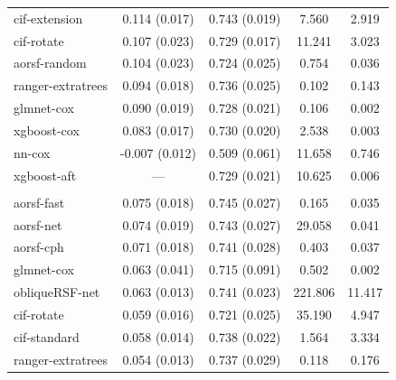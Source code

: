 \documentclass{article}\usepackage[]{graphicx}\usepackage[]{xcolor}
\newenvironment{knitrout}{}{} %
\begin{document}
\begin{knitrout}
\begin{longtable}[t]{lcccc}
\hspace{1em}cif-extension & 0.114 (0.017) & 0.743 (0.019) & 7.560 & 2.919\\
\hspace{1em}cif-rotate & 0.107 (0.023) & 0.729 (0.017) & 11.241 & 3.023\\
\hspace{1em}aorsf-random & 0.104 (0.023) & 0.724 (0.025) & 0.754 & 0.036\\
\hspace{1em}ranger-extratrees & 0.094 (0.018) & 0.736 (0.025) & 0.102 & 0.143\\
\hspace{1em}glmnet-cox & 0.090 (0.019) & 0.728 (0.021) & 0.106 & 0.002\\
\hspace{1em}xgboost-cox & 0.083 (0.017) & 0.730 (0.020) & 2.538 & 0.003\\
\hspace{1em}nn-cox & -0.007 (0.012) & 0.509 (0.061) & 11.658 & 0.746\\
\hspace{1em}xgboost-aft & --- & 0.729 (0.021) & 10.625 & 0.006\\
\addlinespace[0.3em]
\multicolumn{5}{l}{\textit{\textbf{GUIDE-IT; CVD death, n = 894, p = 59}}}\\
\hline
\hspace{1em}aorsf-fast & 0.075 (0.018) & 0.745 (0.027) & 0.165 & 0.035\\
\hspace{1em}aorsf-net & 0.074 (0.019) & 0.743 (0.027) & 29.058 & 0.041\\
\hspace{1em}aorsf-cph & 0.071 (0.018) & 0.741 (0.028) & 0.403 & 0.037\\
\hspace{1em}glmnet-cox & 0.063 (0.041) & 0.715 (0.091) & 0.502 & 0.002\\
\hspace{1em}obliqueRSF-net & 0.063 (0.013) & 0.741 (0.023) & 221.806 & 11.417\\
\hspace{1em}cif-rotate & 0.059 (0.016) & 0.721 (0.025) & 35.190 & 4.947\\
\hspace{1em}cif-standard & 0.058 (0.014) & 0.738 (0.022) & 1.564 & 3.334\\
\hspace{1em}ranger-extratrees & 0.054 (0.013) & 0.737 (0.029) & 0.118 & 0.176\\

\end{longtable}
\end{knitrout}
\end{document}
